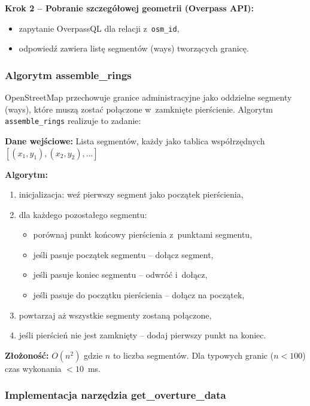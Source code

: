 \textbf{Krok 2 -- Pobranie szczegółowej geometrii (Overpass API):}
\begin{itemize}
    \item zapytanie OverpassQL dla relacji z~\texttt{osm\_id},
    \item odpowiedź zawiera listę segmentów (ways) tworzących granicę.
\end{itemize}

\subsubsection{Algorytm assemble\_rings}

OpenStreetMap przechowuje granice administracyjne jako oddzielne segmenty (ways), które muszą zostać połączone w~zamknięte pierścienie. Algorytm \texttt{assemble\_rings} realizuje to zadanie:

\textbf{Dane wejściowe:} Lista segmentów, każdy jako tablica współrzędnych $[(x_1, y_1), (x_2, y_2), ...]$

\begin{samepage}
\textbf{Algorytm:}
\begin{enumerate}
    \item inicjalizacja: weź pierwszy segment jako początek pierścienia,
    \item dla każdego pozostałego segmentu:
    \begin{itemize}
        \item porównaj punkt końcowy pierścienia z~punktami segmentu,
        \item jeśli pasuje początek segmentu -- dołącz segment,
        \item jeśli pasuje koniec segmentu -- odwróć i~dołącz,
        \item jeśli pasuje do początku pierścienia -- dołącz na początek,
    \end{itemize}
    \item powtarzaj aż wszystkie segmenty zostaną połączone,
    \item jeśli pierścień nie jest zamknięty -- dodaj pierwszy punkt na koniec.
\end{enumerate}
\end{samepage}

\textbf{Złożoność:} $O(n^2)$ gdzie $n$ to liczba segmentów. Dla typowych granic ($n < 100$) czas wykonania $< 10$~ms.

\subsubsection{Implementacja narzędzia get\_overture\_data}

